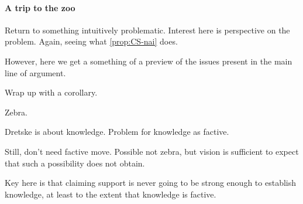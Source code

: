 \paragraph{A trip to the zoo}

\begin{note}
  Return to something intuitively problematic.
  Interest here is perspective on the problem.
  Again, seeing what \autoref{prop:CS-nai} does.

  However, here we get a something of a preview of the issues present in the main line of argument.

  Wrap up with a corollary.
\end{note}

\begin{note}
  Zebra.

  Dretske is about knowledge.
  Problem for knowledge as factive.

  Still, don't need factive move.
  Possible not zebra, but vision is sufficient to expect that such a possibility does not obtain.

  Key here is that claiming support is never going to be strong enough to establish knowledge, at least to the extent that knowledge is factive.
\end{note}

